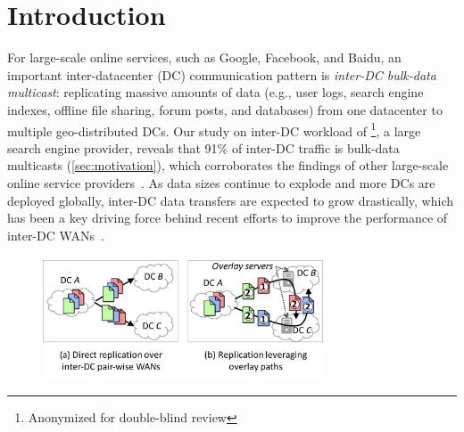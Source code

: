 \section{Introduction}

For large-scale online services, such as Google, Facebook, and
Baidu, an important inter-datacenter (DC) communication pattern is 
{\em inter-DC bulk-data multicast}: replicating massive amounts of data 
(e.g., user logs, search engine indexes, offline file sharing, 
forum posts, and databases) 
from one datacenter to multiple geo-distributed DCs.
Our study on inter-DC workload of \company\footnote{Anonymized for
double-blind review}, a large search engine provider, reveals that
91\% of inter-DC traffic is bulk-data multicasts
(\Section\ref{sec:motivation}), which corroborates the findings of 
other large-scale online service providers~\cite{??,??}.
As data sizes continue to explode and more DCs are deployed 
globally, inter-DC data transfers are expected
to grow drastically, which has been a key driving force behind
recent efforts to improve the performance of inter-DC
WANs~\cite{savage1999Theend,jain2013b4,kumar2015bwe,hong2013achieving,zhang2015guarantee}.




\begin{figure}[t!]
\includegraphics[width=83mm]{images/intro-example.pdf}
\vspace{-0.4cm}
\label{fig:intro}
\vspace{-0.4cm}
\end{figure}


